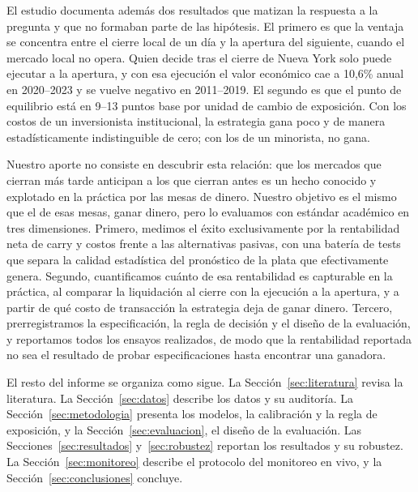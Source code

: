 \documentclass[11pt,a4paper]{article}
\begin{document}
El estudio documenta además dos resultados que matizan la respuesta a la pregunta y que no formaban parte de las hipótesis. El primero es que la ventaja se concentra entre el cierre local de un día y la apertura del siguiente, cuando el mercado local no opera. Quien decide tras el cierre de Nueva York solo puede ejecutar a la apertura, y con esa ejecución el valor económico cae a 10,6\% anual en 2020--2023 y se vuelve negativo en 2011--2019. El segundo es que el punto de equilibrio está en 9--13 puntos base por unidad de cambio de exposición. Con los costos de un inversionista institucional, la estrategia gana poco y de manera estadísticamente indistinguible de cero; con los de un minorista, no gana.

Nuestro aporte no consiste en descubrir esta relación: que los mercados que cierran más tarde anticipan a los que cierran antes es un hecho conocido y explotado en la práctica por las mesas de dinero. Nuestro objetivo es el mismo que el de esas mesas, ganar dinero, pero lo evaluamos con estándar académico en tres dimensiones. Primero, medimos el éxito exclusivamente por la rentabilidad neta de carry y costos frente a las alternativas pasivas, con una batería de tests que separa la calidad estadística del pronóstico de la plata que efectivamente genera. Segundo, cuantificamos cuánto de esa rentabilidad es capturable en la práctica, al comparar la liquidación al cierre con la ejecución a la apertura, y a partir de qué costo de transacción la estrategia deja de ganar dinero. Tercero, prerregistramos la especificación, la regla de decisión y el diseño de la evaluación, y reportamos todos los ensayos realizados, de modo que la rentabilidad reportada no sea el resultado de probar especificaciones hasta encontrar una ganadora.

El resto del informe se organiza como sigue. La Sección~\ref{sec:literatura} revisa la literatura. La Sección~\ref{sec:datos} describe los datos y su auditoría. La Sección~\ref{sec:metodologia} presenta los modelos, la calibración y la regla de exposición, y la Sección~\ref{sec:evaluacion}, el diseño de la evaluación. Las Secciones~\ref{sec:resultados} y~\ref{sec:robustez} reportan los resultados y su robustez. La Sección~\ref{sec:monitoreo} describe el protocolo del monitoreo en vivo, y la Sección~\ref{sec:conclusiones} concluye.
\end{document}
